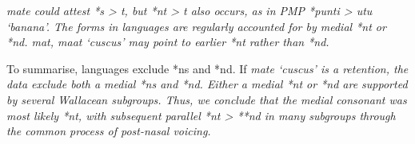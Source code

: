  \it{mate} could attest *s > \it{t},
but *nt > \it{t} also occurs,
as in PMP *punti > \it{utu} ‘banana’.
The forms in  languages are regularly accounted
for by medial *nt or *nd.
 \it{mat, maat} ‘cuscus’ may point to earlier *nt rather than *nd.

To summarise,  languages exclude *ns and *nd.
If  \it{mate} ‘cuscus’ is a retention,
the  data exclude both a medial *ns and *nd.
Either a medial *nt or *nd are supported by several Wallacean subgroups.
Thus, we conclude that the medial consonant was most likely *nt,
with subsequent parallel *nt > **nd in many subgroups through
the common process of post-nasal voicing.

